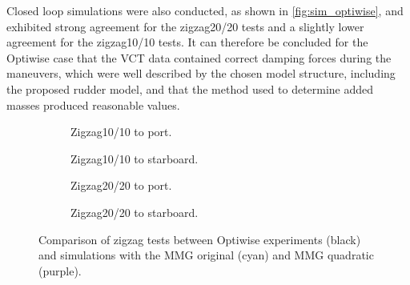 Closed loop simulations were also conducted, as shown in \autoref{fig:sim_optiwise}, and exhibited strong agreement for the zigzag20/20 tests and a slightly lower agreement for the zigzag10/10 tests.
It can therefore be concluded for the Optiwise case that
the VCT data contained correct damping forces during the maneuvers, which were well
described by the chosen model structure, including the proposed rudder model, and that the method used to determine added masses produced reasonable values.
\begin{figure}[h]
     \centering
     \begin{subfigure}[b]{0.49\textwidth}
         \centering
         
        \caption{Zigzag10/10 to port.}
        \label{fig:sim_optiwise_10_port}
     \end{subfigure}
     \hfill
     \begin{subfigure}[b]{0.49\textwidth}
         
        \caption{Zigzag10/10 to starboard.}
        \label{fig:sim_optiwise_10_stbd}
     \end{subfigure}
     \vfill
     \begin{subfigure}[b]{0.49\textwidth}
         \centering
         
        \caption{Zigzag20/20 to port.}
        \label{fig:sim_optiwise_20_port}
     \end{subfigure}
     \hfill
     \begin{subfigure}[b]{0.49\textwidth}
         
        \caption{Zigzag20/20 to starboard.}
        \label{fig:sim_optiwise_20_stbd}
     \end{subfigure}
     
        \caption{Comparison of zigzag tests between Optiwise experiments (black) and simulations with the MMG original (cyan) and MMG quadratic (purple).}
        \label{fig:sim_optiwise}
\end{figure}